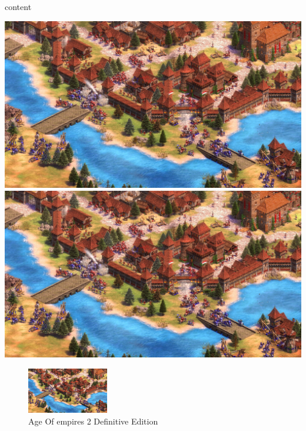 \documentclass{article}
\begin{document}
	\listoffigures
	
	\setlength{\fboxsep}{15pt}
	
	content
	
	\setlength{\fboxrule}{4pt}
	
	\includegraphics[clip=true, trim=15mm 5mm 7mm 3mm]{aage.jpg}
	\includegraphics[angle=170]{aage.jpg}
	
	\begin{figure}[h]
		\centering
		\caption{Age Of empires 2 Definitive Edition}
		\includegraphics[height=2cm]{aage.jpg}
	\end{figure}
\end{document}
